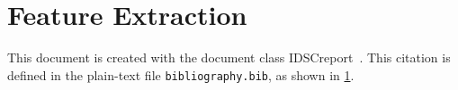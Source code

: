 
\chapter{Feature Extraction}
\label{chp:FeatureExtractionChapter}

This document is created with the document class IDSCreport~\cite{IDSCreportClass}. This citation is defined in the plain-text file \texttt{bibliography.bib}, as shown in \cref{chp:FeatureExtractionChapter}.